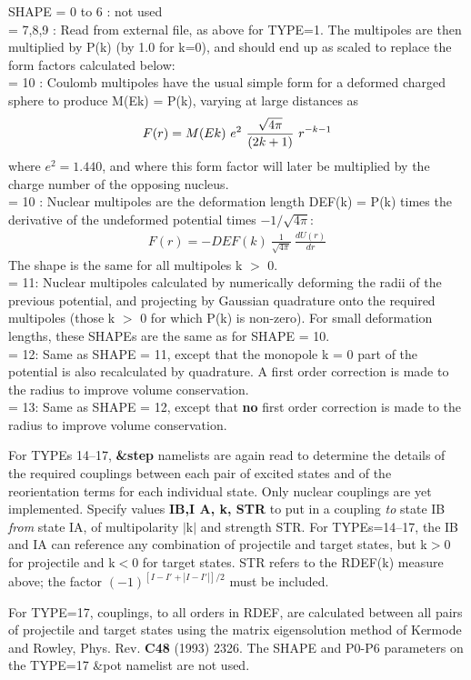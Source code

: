 \documentclass[11pt]{article}
\newcommand{\beqn}{\begin{eqnarray}}
\newcommand{\eeqn}{\end{eqnarray}}
\begin{document}
SHAPE
     = 0 to 6 : not used 
\\
     = 7,8,9 : Read from external file, as above for TYPE=1.
The multipoles are then multiplied by P(k) (by 1.0 for k=0), and
should end up as scaled to replace the form factors calculated
below:
\\
= 10 : Coulomb multipoles have the usual simple form for a
deformed charged sphere to produce M(Ek) = P(k),
varying at large distances as
\beqn
      F(r) = M(Ek) ~ e^2 ~ {\sqrt{4\pi}   \over  (2k+1)}~  r^{-k-1}
\eeqn
where $e^2=1.440$, and where this form factor will later be multiplied
by the charge number of the opposing nucleus.
\\
= 10 : Nuclear multipoles are the deformation length DEF(k) = P(k)
times the derivative of the undeformed potential times $-1/\sqrt{4\pi}$:
\beqn
      F(r) = - DEF(k) ~  \frac{1}{\sqrt{4\pi}} ~ \frac{dU(r)}{dr}
\eeqn
The shape is the same for all multipoles k $>$ 0.
\\
= 11: Nuclear multipoles calculated by numerically deforming the radii
of the previous potential, and projecting by Gaussian quadrature
onto the required multipoles (those k $>$ 0 for which P(k) is non-zero).
For small deformation lengths, these SHAPEs are the same as for
SHAPE = 10.
\\
= 12: Same as SHAPE = 11, except that the monopole k = 0 part of
the potential is also recalculated by quadrature. A first order
correction is made to the radius to improve volume conservation.
\\
= 13: Same as SHAPE = 12, except that {\bf no} first order
correction is made to the radius to improve volume conservation.

\bigskip

For TYPEs 14--17,  {\bf \&step} namelists are again read to determine the details of the
required couplings between each pair of excited states
and of the reorientation terms for each individual state.
Only nuclear couplings are yet implemented.
Specify values { \bf IB,I A, k, STR} 
to put in a coupling {\em to} state IB {\em from} state IA,
of multipolarity $|$k$|$ and strength STR. For TYPEs=14--17, the IB and IA
can reference any combination of projectile and target states,
but k$>$0 for projectile and k$<$0 for target states.
STR refers to the RDEF(k) measure above;
the factor  $(-1)^{ [I-I'+|I-I'|]/2}$ must be included.

For TYPE=17, couplings, to all orders in RDEF, are calculated between all
pairs of projectile and target states using the matrix eigensolution
method of Kermode and Rowley, Phys. Rev. {\bf C48} (1993) 2326.
The SHAPE and P0-P6 parameters on the TYPE=17 \&pot namelist are not used.
\end{document}
